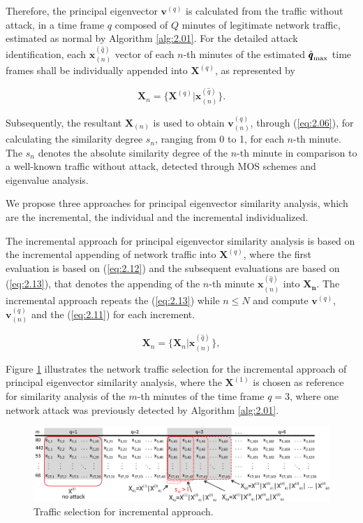 Therefore, the principal eigenvector $\pmb{v}^{(q)}$ is calculated from the traffic without attack, in a time frame $q$ composed of $Q$ minutes of legitimate network traffic, estimated as normal by Algorithm \ref{alg:2.01}. For the detailed attack identification, each $\pmb{x}^{(\hat{q})}_{(n)}$ vector of each $n$-th minutes of the estimated $\rm{\hat{\pmb{q}}}_{\rm max}$ time frames shall be individually appended into $\pmb{X}^{(q)}$, as represented by

\begin{equation}\label{eq:2.12}
\pmb{X}_{n} = \{\pmb{X}^{(q)} | \pmb{x}^{(\hat{q})}_{(n)}\}.
\end{equation}

Subsequently, the resultant $\pmb{X}_{(n)}$ is used to obtain $\pmb{v}_{(n)}^{(q)}$, through (\ref{eq:2.06}), for calculating the similarity degree $s_n$, ranging from 0 to 1, for each $n$-th minute. The $s_n$ denotes the absolute similarity degree of the $n$-th minute in comparison to a well-known traffic without attack, detected through MOS schemes and eigenvalue analysis.

We propose three approaches for principal eigenvector similarity analysis, which are the incremental, the individual and the incremental individualized.

The incremental approach for principal eigenvector similarity analysis is based on the incremental appending of network traffic into $\pmb{X}^{(q)}$, where the first evaluation is based on (\ref{eq:2.12}) and the subsequent evaluations are based on (\ref{eq:2.13}), that denotes the appending of the $n$-th minute $\pmb{x}^{(\hat{q})}_{(n)}$ into $\pmb{X_n}$. The incremental approach repeats the (\ref{eq:2.13}) while $n \leq N$ and compute $\pmb{v}^{(q)}$, $\pmb{v}_{(n)}^{(q)}$ and the (\ref{eq:2.11}) for each increment.

\begin{equation}\label{eq:2.13}
\pmb{X}_{n} = \{\pmb{X}_{n} | \pmb{x}^{(\hat{q})}_{(n)}\},
\end{equation}

Figure \ref{fig:2.88} illustrates the network traffic selection for the incremental approach of principal eigenvector similarity analysis, where the $\pmb{X}^{(1)}$ is chosen as reference for similarity analysis of the $m$-th minutes of the time frame $q=3$, where one network attack was previously detected by Algorithm \ref{alg:2.01}. 

\begin{figure}[h!]
     \includegraphics[width=15cm]{figures/ch2/incremental.eps}
     \caption{Traffic selection for incremental approach.}
     \label{fig:2.88}
\end{figure}


